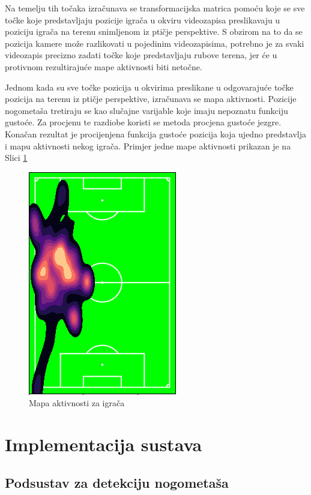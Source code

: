 \documentclass[times, utf8, seminar, numeric]{fer}
\begin{document}
Na temelju tih točaka izračunava se transformacijska matrica pomoću koje se sve točke koje predstavljaju pozicije igrača u okviru videozapisa preslikavaju u poziciju igrača na terenu snimljenom iz ptičje perspektive. S obzirom na to da se pozicija kamere može razlikovati u pojedinim videozapisima, potrebno je za svaki videozapis precizno zadati točke koje predstavljaju rubove terena, jer će u protivnom rezultirajuće mape aktivnosti biti netočne.

Jednom kada su sve točke pozicija u okvirima preslikane u odgovarajuće točke pozicija na terenu iz ptičje perspektive, izračunava se mapa aktivnosti. Pozicije nogometaša tretiraju se kao slučajne varijable koje imaju nepoznatu funkciju gustoće. Za procjenu te razdiobe koristi se metoda procjena gustoće jezgre. Konačan rezultat je procijenjena funkcija gustoće pozicija koja ujedno predstavlja i mapu aktivnosti nekog igrača. Primjer jedne mape aktivnosti prikazan je na Slici \ref{fig:heatmap}

\begin{figure}
	\centering
	\includegraphics[scale=1]{slike/heatmap.png}
	\caption {Mapa aktivnosti za igrača}
	\label{fig:heatmap}	
\end{figure}


\chapter{Implementacija sustava}

\section{Podsustav za detekciju nogometaša}
\end{document}
